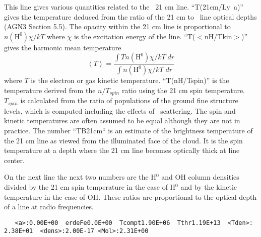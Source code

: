 This line gives various quantities related to the \hi\ 21 cm line.
``T(21cm/Ly~a)''  gives the temperature deduced from the ratio of the 21
cm to \la\ line optical depths (AGN3 Section 5.5).
The opacity within the
21 cm line is proportional to
$n\left( {{{\mathrm{H}}^0}} \right)\chi /kT$
where $\chi$ is the excitation energy of the line.
``T($<$nH/Tkin$>$)'' gives the harmonic mean  temperature
\begin{equation}
 \left\langle T\right\rangle  = \frac{{\int {Tn\left( {{{\mathrm{H}}^0}} \right)\chi /kT\;dr}
}}{{\int {n\left( {{{\mathrm{H}}^0}} \right)\chi /kT\;dr} }}%
\end{equation}
where $T$ is the electron or gas kinetic temperature.
``T(nH/Tspin)''  is
the temperature derived from the $n/T_{spin}$ ratio using the 21 cm spin
temperature.
$T_{spin}$ is calculated from the ratio of populations of the
ground fine structure levels, which is computed including the effects of
\la\ scattering.
The spin and kinetic temperatures are often assumed to be
equal although they are not in practice.
The number ``TB21cm`` is an
estimate of the brightness temperature of the 21 cm line as viewed from
the illuminated face of the cloud.
It is the spin temperature at a depth
where the 21 cm line becomes optically thick at line center.

On the next line 
the next two numbers are the H$^0$ and OH column densities
divided by the 21 cm spin temperature in the case of H$^0$
and by the kinetic
temperature in the case of OH.
These ratios are proportional to the optical
depth of a line at radio frequencies.
{\setverbatimfontsize{\tiny}
\begin{verbatim}
   <a>:0.00E+00  erdeFe0.0E+00  Tcompt1.90E+06  Tthr1.19E+13  <Tden>: 2.38E+01  <dens>:2.00E-17 <Mol>:2.31E+00
\end{verbatim}
}

